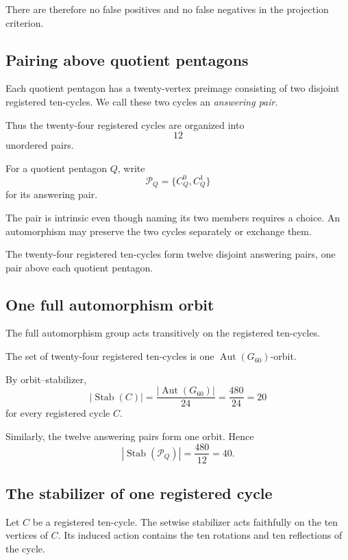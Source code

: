 There are therefore no false positives and no false negatives in the
projection criterion.

\subsection{Pairing above quotient pentagons}

Each quotient pentagon has a twenty-vertex preimage consisting of two
disjoint registered ten-cycles. We call these two cycles an
\emph{answering pair}.

Thus the twenty-four registered cycles are organized into
\[
12
\]
unordered pairs.

For a quotient pentagon \(Q\), write
\[
\mathcal P_Q=\{C_Q^0,C_Q^1\}
\]
for its answering pair.

The pair is intrinsic even though naming its two members requires a
choice. An automorphism may preserve the two cycles separately or
exchange them.

\begin{proposition}
The twenty-four registered ten-cycles form twelve disjoint answering
pairs, one pair above each quotient pentagon.
\end{proposition}

\subsection{One full automorphism orbit}

The full automorphism group acts transitively on the registered
ten-cycles.

\begin{theorem}
The set of twenty-four registered ten-cycles is one
\(\operatorname{Aut}(G_{60})\)-orbit.
\end{theorem}

By orbit--stabilizer,
\[
|\operatorname{Stab}(C)|
=
\frac{|\operatorname{Aut}(G_{60})|}{24}
=
\frac{480}{24}
=
20
\]
for every registered cycle \(C\).

Similarly, the twelve answering pairs form one orbit. Hence
\[
|\operatorname{Stab}(\mathcal P_Q)|
=
\frac{480}{12}
=
40.
\]

\subsection{The stabilizer of one registered cycle}

Let \(C\) be a registered ten-cycle. The setwise stabilizer acts
faithfully on the ten vertices of \(C\). Its induced action contains
the ten rotations and ten reflections of the cycle.

